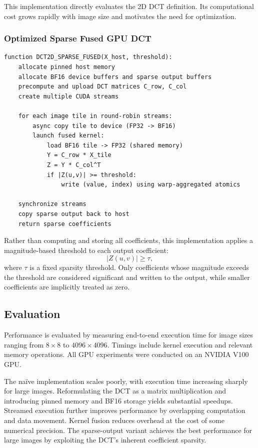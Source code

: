 \documentclass{article}
\begin{document}
This implementation directly evaluates the 2D DCT definition. Its computational cost grows rapidly with image size and motivates the need for optimization.

\subsubsection{Optimized Sparse Fused GPU DCT}

\begin{verbatim}
function DCT2D_SPARSE_FUSED(X_host, threshold):
    allocate pinned host memory
    allocate BF16 device buffers and sparse output buffers
    precompute and upload DCT matrices C_row, C_col
    create multiple CUDA streams

    for each image tile in round-robin streams:
        async copy tile to device (FP32 -> BF16)
        launch fused kernel:
            load BF16 tile -> FP32 (shared memory)
            Y = C_row * X_tile
            Z = Y * C_col^T
            if |Z(u,v)| >= threshold:
                write (value, index) using warp-aggregated atomics

    synchronize streams
    copy sparse output back to host
    return sparse coefficients
\end{verbatim}

\noindent Rather than computing and storing all coefficients, this implementation applies a magnitude-based threshold to each output coefficient:
\[
|Z(u,v)| \ge \tau,
\]
where $\tau$ is a fixed sparsity threshold. Only coefficients whose magnitude exceeds the threshold are considered significant and written to the output, while smaller coefficients are implicitly treated as zero.



\subsection{Evaluation}

Performance is evaluated by measuring end-to-end execution time for image sizes ranging from $8 \times 8$ to $4096 \times 4096$. Timings include kernel execution and relevant memory operations. All GPU experiments were conducted on an NVIDIA V100 GPU.

The naïve implementation scales poorly, with execution time increasing sharply for large images. Reformulating the DCT as a matrix multiplication and introducing pinned memory and BF16 storage yields substantial speedups. Streamed execution further improves performance by overlapping computation and data movement. Kernel fusion reduces overhead at the cost of some numerical precision. The sparse-output variant achieves the best performance for large images by exploiting the DCT’s inherent coefficient sparsity.
\end{document}
